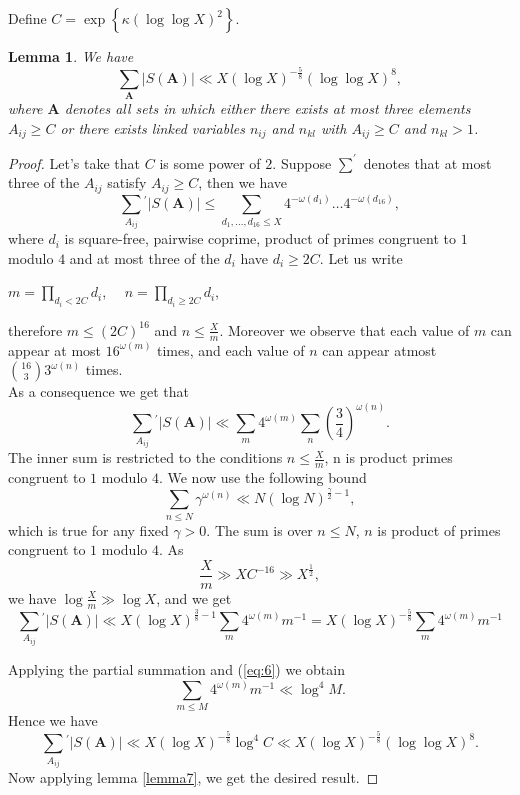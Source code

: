 \documentclass[11pt]{article}
\newcommand{\A}{ \textbf{A} }
\newtheorem{lemma}[theorem]{Lemma}
\begin{document}
\noindent Define $C=\exp\left\{\kappa(\log \log X)^{2}\right\}$.
\begin{lemma}\label{lemma8}
We have 
$$\sum\limits_{\A}|S(\A)|\ll X(\log X)^{-\frac{5}{8}}(\log \log X)^{8},$$
where $\A$ denotes all sets in which either there exists at most three elements $A_{ij}\geq C$ or there exists linked variables $n_{ij}$ and $n_{kl}$ with $A_{ij}\geq C$ and $n_{kl}>1$.
\end{lemma}
\begin{proof}
Let's take that $C$ is some power of $2$. Suppose $\sum^{\prime}$ denotes that at most three of the $A_{ij}$ satisfy $A_{ij}\geq C$, then we have 
$$\sum_{A_{ij}}{}^{'}|S(\A)|\leq \sum_{d_{1},\ldots ,d_{16}\leq X}4^{-\omega(d_{1})}\ldots 4^{-\omega(d_{16})},$$
where $d_{i}$ is square-free, pairwise coprime, product of primes congruent to $1$ modulo $4$ and at most three of the $d_{i}$ have $d_{i}\geq 2C$. Let us write
\begin{center}
$m=\prod\limits_{d_{i}<2C}d_{i}$, $\quad n=\prod\limits_{d_{i}\geq 2C}d_{i}$,
\end{center}
therefore $m\leq (2C)^{16}$ and $n\leq \frac{X}{m}$. Moreover we observe that each value of $m$ can appear at most $16^{\omega(m)}$ times, and each value of $n$ can appear atmost $\binom{16}{3}3^{\omega(n)}$ times.\\

\noindent As a consequence we get that
$$\sum_{A_{ij}}{}^{'}|S(\A)|\ll \sum\limits_{m}4^{\omega(m)}\sum\limits_{n}\left(\frac{3}{4}\right)^{\omega(n)}.$$ 
The inner sum is restricted to the conditions $n\leq \frac{X}{m}$, n is product primes congruent to $1$ modulo $4$.
We now use the following bound
\begin{equation}\label{eq:6}
\sum\limits_{n\leq N}\gamma^{\omega(n)}\ll N(\log N)^{\frac{\gamma}{2}-1},
\end{equation}
which is true for any fixed $\gamma>0$. The sum is over $n\leq N$, $n$ is product of primes congruent to $1$ modulo $4$. As
$$\frac{X}{m}\gg XC^{-16}\gg X^{\frac{1}{2}},$$
we have $\log \frac{X}{m}\gg \log X$, and we get
\\


$$\sum_{A_{ij}}{}^{'}|S(\A)|\ll X(\log X)^{\frac{3} {8}-1}\sum\limits_{m}4^{\omega(m)}m^{-1} = X(\log X)^{-\frac{5} {8}}\sum\limits_{m}4^{\omega(m)}m^{-1} $$

Applying the partial summation and (\ref{eq:6}) we obtain
$$\sum\limits_{m\leq M}4^{\omega(m)}m^{-1}\ll \log^{4}M.$$
Hence we have
$$\sum_{A_{ij}}{}^{'}|S(\A)|\ll X(\log X)^{-\frac{5}{8}}\log^{4}C\ll  X(\log X)^{-\frac{5}{8}}(\log \log X)^{8}.$$
Now applying lemma \ref{lemma7}, we get the desired result.
\end{proof}
\end{document}
